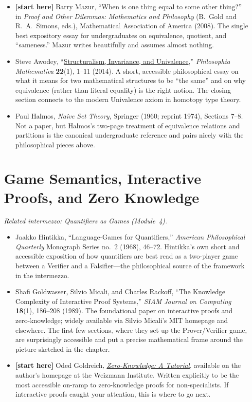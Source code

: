 \documentclass[11pt]{article}
\begin{document}
\begin{itemize}
  \item \textbf{[start here]} Barry Mazur, ``\href{https://people.math.osu.edu/cogdell.1/6112-Mazur-www.pdf}{When is one thing equal to some other thing?}'' in \emph{Proof and Other Dilemmas: Mathematics and Philosophy} (B.~Gold and R.~A.\ Simons, eds.), Mathematical Association of America (2008). The single best expository essay for undergraduates on equivalence, quotient, and ``sameness.'' Mazur writes beautifully and assumes almost nothing.
  \item Steve Awodey, ``\href{https://www.andrew.cmu.edu/user/awodey/preprints/siu.pdf}{Structuralism, Invariance, and Univalence},'' \emph{Philosophia Mathematica} \textbf{22}(1), 1--11 (2014). A short, accessible philosophical essay on what it means for two mathematical structures to be ``the same'' and on why equivalence (rather than literal equality) is the right notion. The closing section connects to the modern Univalence axiom in homotopy type theory.
  \item Paul Halmos, \emph{Naive Set Theory}, Springer (1960; reprint 1974), Sections 7--8. Not a paper, but Halmos's two-page treatment of equivalence relations and partitions is the canonical undergraduate reference and pairs nicely with the philosophical pieces above.
\end{itemize}

\section*{Game Semantics, Interactive Proofs, and Zero Knowledge}
\emph{Related intermezzo: Quantifiers as Games (Module~4).}

\begin{itemize}
  \item Jaakko Hintikka, ``Language-Games for Quantifiers,'' \emph{American Philosophical Quarterly} Monograph Series no.~2 (1968), 46--72. Hintikka's own short and accessible exposition of how quantifiers are best read as a two-player game between a Verifier and a Falsifier---the philosophical source of the framework in the intermezzo.
  \item Shafi Goldwasser, Silvio Micali, and Charles Rackoff, ``The Knowledge Complexity of Interactive Proof Systems,'' \emph{SIAM Journal on Computing} \textbf{18}(1), 186--208 (1989). The foundational paper on interactive proofs and zero-knowledge; widely available via Silvio Micali's MIT homepage and elsewhere. The first few sections, where they set up the Prover/Verifier game, are surprisingly accessible and put a precise mathematical frame around the picture sketched in the chapter.
  \item \textbf{[start here]} Oded Goldreich, \emph{\href{https://www.wisdom.weizmann.ac.il/~oded/zk-tut02.html}{Zero-Knowledge: A Tutorial}}, available on the author's homepage at the Weizmann Institute. Written explicitly to be the most accessible on-ramp to zero-knowledge proofs for non-specialists. If interactive proofs caught your attention, this is where to go next.
\end{itemize}
\end{document}

